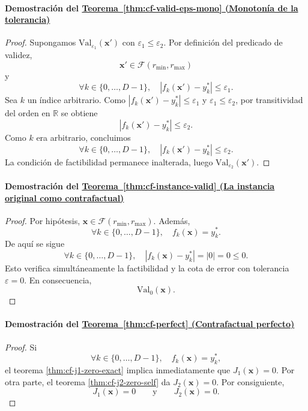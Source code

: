 \documentclass[12pt]{report} %
\begin{document}
\paragraph*{Demostración del \hyperref[thm:cf-valid-eps-mono]{Teorema~\ref*{thm:cf-valid-eps-mono} (Monotonía de la tolerancia)}}
\begin{proof}
    Supongamos $\mathrm{Val}_{\varepsilon_1}(\mathbf{x}')$ con $\varepsilon_1 \le \varepsilon_2$. Por definición del predicado de validez,
    $$\mathbf{x}' \in \mathcal{F}(r_{\min}, r_{\max})$$
    y
    $$\forall k \in \{0, \ldots, D-1\},\quad |f_k(\mathbf{x}') - y_k^*| \le \varepsilon_1.$$
    Sea $k$ un índice arbitrario. Como $|f_k(\mathbf{x}') - y_k^*| \le \varepsilon_1$ y $\varepsilon_1 \le \varepsilon_2$, por transitividad del orden en $\mathbb{R}$ se obtiene
    $$|f_k(\mathbf{x}') - y_k^*| \le \varepsilon_2.$$
    Como $k$ era arbitrario, concluimos
    $$\forall k \in \{0, \ldots, D-1\},\quad |f_k(\mathbf{x}') - y_k^*| \le \varepsilon_2.$$
    La condición de factibilidad permanece inalterada, luego $\mathrm{Val}_{\varepsilon_2}(\mathbf{x}')$.
\end{proof}

\paragraph*{Demostración del \hyperref[thm:cf-instance-valid]{Teorema~\ref*{thm:cf-instance-valid} (La instancia original como contrafactual)}}
\begin{proof}
    Por hipótesis, $\mathbf{x} \in \mathcal{F}(r_{\min}, r_{\max})$. Además,
    $$\forall k \in \{0, \ldots, D-1\},\quad f_k(\mathbf{x}) = y_k^*.$$
    De aquí se sigue
    $$\forall k \in \{0, \ldots, D-1\},\quad |f_k(\mathbf{x}) - y_k^*| = |0| = 0 \le 0.$$
    Esto verifica simultáneamente la factibilidad y la cota de error con tolerancia $\varepsilon = 0$. En consecuencia,
    $$\mathrm{Val}_0(\mathbf{x}).$$
\end{proof}

\paragraph*{Demostración del \hyperref[thm:cf-perfect]{Teorema~\ref*{thm:cf-perfect} (Contrafactual perfecto)}}
\begin{proof}
    Si
    $$\forall k \in \{0, \ldots, D-1\},\quad f_k(\mathbf{x}) = y_k^*,$$
    el teorema \hyperref[thm:cf-j1-zero-exact]{\ref*{thm:cf-j1-zero-exact}} implica inmediatamente que $J_1(\mathbf{x}) = 0$. Por otra parte, el teorema \hyperref[thm:cf-j2-zero-self]{\ref*{thm:cf-j2-zero-self}} da $J_2(\mathbf{x}) = 0$. Por consiguiente,
    $$J_1(\mathbf{x}) = 0 \qquad \text{y} \qquad J_2(\mathbf{x}) = 0.$$
\end{proof}
\end{document}
